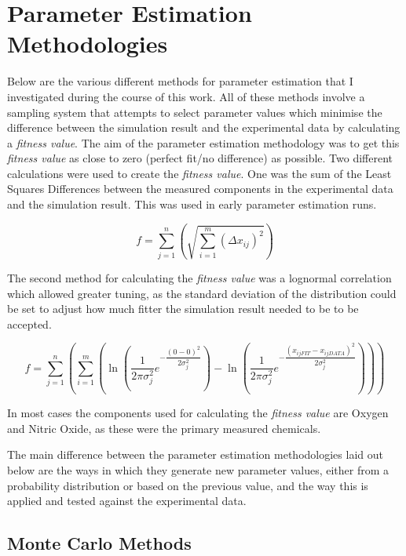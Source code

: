 \chapter{Parameter Estimation Methodologies}
\label{chap:paramest}

Below are the various different methods for parameter estimation that I investigated during the course of this work. All of these methods involve a sampling system that attempts to select parameter values which minimise the difference between the simulation result and the experimental data by calculating a \textit{fitness value}. The aim of the parameter estimation methodology was to get this \textit{fitness value} as close to zero (perfect fit/no difference) as possible. Two different calculations were used to create the \textit{fitness value}. One was the sum of the Least Squares Differences between the measured components in the experimental data and the simulation result. This was used in early parameter estimation runs.

\begin{equation}
f = \sum^{n}_{j=1}\left(\sqrt{\sum^{m}_{i=1} (\Delta x_{ij})^2}\right)
\end{equation}

The second method for calculating the \textit{fitness value} was a lognormal correlation which allowed greater tuning, as the standard deviation of the distribution could be set to adjust how much fitter the simulation result needed to be to be accepted.

\begin{equation}
f = \sum^{n}_{j=1}\left(\sum^{m}_{i=1}\left(\ln\left(\dfrac{1}{2\pi\sigma_j^2}e^{-\dfrac{{(0-0)^2}}{2\sigma_j^2}}\right) - \ln\left(\dfrac{1}{2\pi\sigma_j^2}e^{-\dfrac{{(x_{ijFIT}-x_{ijDATA})^2}}{2\sigma_j^2}}\right)\right)\right)
\end{equation}

In most cases the components used for calculating the \textit{fitness value} are Oxygen and Nitric Oxide, as these were the primary measured chemicals.

The main difference between the parameter estimation methodologies laid out below are the ways in which they generate new parameter values, either from a probability distribution or based on the previous value, and the way this is applied and tested against the experimental data.

\section*{Monte Carlo Methods}

